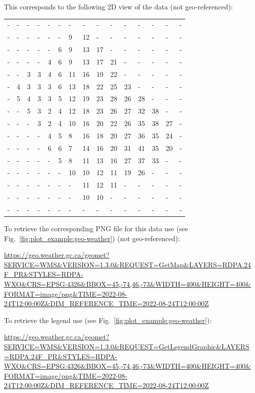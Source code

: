 \documentclass[10pt,a4paper,titlepage,parskip]{scrartcl}
\begin{document}
This corresponds to the following 2D view of the data (not geo-referenced):
\begin{table}[h]
	\begin{tabular}{R{0.5cm}R{0.5cm}R{0.5cm}R{0.5cm}R{0.5cm}R{0.5cm}R{0.5cm}R{0.5cm}R{0.5cm}R{0.5cm}R{0.5cm}R{0.5cm}R{0.5cm}R{0.5cm}R{0.5cm}}
- & - & - & - & - & - & - & - & - & - & - & - & - & - & -\\
- & - & - & - & - & - & 9 & 12 & - & - & - & - & - & - & -\\
- & - & - & - & - & 6 & 9 & 13 & 17 & - & - & - & - & - & -\\
- & - & - & - & 4 & 6 & 9 & 13 & 17 & 21 & - & - & - & - & -\\
- & - & 3 & 3 & 4 & 6 & 11 & 16 & 19 & 22 & - & - & - & - & -\\
- & 4 & 3 & 3 & 3 & 6 & 13 & 18 & 22 & 25 & 23 & - & - & - & -\\
- & 5 & 4 & 3 & 3 & 5 & 12 & 19 & 23 & 28 & 26 & 28 & - & - & -\\
- & - & 5 & 3 & 2 & 4 & 12 & 18 & 23 & 26 & 27 & 32 & 38 & - & -\\
- & - & - & 3 & 2 & 4 & 10 & 16 & 20 & 22 & 26 & 35 & 38 & 27 & -\\
- & - & - & - & 4 & 5 & 8 & 16 & 18 & 20 & 27 & 36 & 35 & 24 & -\\
- & - & - & - & 6 & 6 & 7 & 14 & 16 & 20 & 31 & 41 & 35 & 20 & -\\
- & - & - & - & - & 5 & 8 & 11 & 13 & 16 & 27 & 37 & 33 & - & -\\
- & - & - & - & - & - & 10 & 10 & 12 & 11 & 19 & 26 & - & - & -\\
- & - & - & - & - & - & - & 11 & 12 & 11 & - & - & - & - & -\\
- & - & - & - & - & - & - & 10 & 10 & - & - & - & - & - & -\\
- & - & - & - & - & - & - & - & - & - & - & - & - & - & -\\				
	\end{tabular}
\end{table}
\pagebreak

To retrieve the corresponding PNG file for this data use (see Fig.~\ref{fig:plot_example:geo-weather}) (not geo-referenced):
\begin{framed}
\url{https://geo.weather.gc.ca/geomet?SERVICE=WMS&VERSION=1.3.0&REQUEST=GetMap&LAYERS=RDPA.24F_PR&STYLES=RDPA-WXO&CRS=EPSG:4326&BBOX=45,-74,46,-73&WIDTH=400&HEIGHT=400&FORMAT=image/png&TIME=2022-08-24T12:00:00Z&DIM_REFERENCE_TIME=2022-08-24T12:00:00Z}
\end{framed}
To retrieve the legend use (see Fig.~\ref{fig:plot_example:geo-weather}):
\begin{framed}
	\url{https://geo.weather.gc.ca/geomet?SERVICE=WMS&VERSION=1.3.0&REQUEST=GetLegendGraphic&LAYERS=RDPA.24F_PR&STYLES=RDPA-WXO&CRS=EPSG:4326&BBOX=45,-74,46,-73&WIDTH=400&HEIGHT=400&FORMAT=image/png&TIME=2022-08-24T12:00:00Z&DIM_REFERENCE_TIME=2022-08-24T12:00:00Z}
\end{framed}
\end{document}
